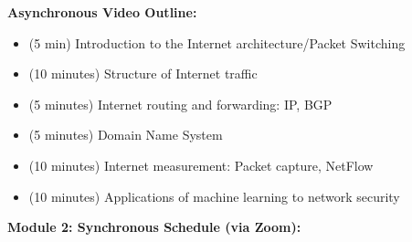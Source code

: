 \documentclass[12pt]{article}
\renewcommand{\_}{\kern-1.5pt\textunderscore\kern-1.5pt}
\begin{document}
\vspace{\baselineskip}
\textbf{Asynchronous Video Outline:}\par

\begin{itemize}
	\item (5 min) Introduction to the Internet architecture/Packet Switching\par

	\item (10 minutes) Structure of Internet traffic\par

	\item (5 minutes) Internet routing and forwarding: IP, BGP\par

	\item (5 minutes) Domain Name System\par

	\item (10 minutes) Internet measurement: Packet capture, NetFlow\par

	\item (10 minutes) Applications of machine learning to network security\\

\end{itemize}\par

\textbf{Module 2: Synchronous Schedule (via Zoom): }\par




\newpage

\vspace{\baselineskip}
\vspace{\baselineskip}


\end{document}
